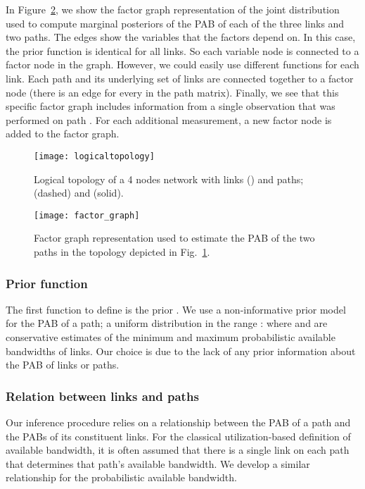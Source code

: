 \documentclass[final,5p,times,twocolumn]{elsarticle}
\begin{document}
In Figure~\ref{fig:factor_graph}, we show the factor graph representation of the joint distribution used to compute marginal posteriors of the PAB of each of the three links and two paths.  The edges show the variables that the factors depend on.  In this case, the prior function is identical for all links.  So each variable node  is connected to a factor node  in the graph.  However, we could easily use different functions for each link.  Each path and its underlying set of links  are connected together to a factor node  (there is an edge for every  in the path matrix).  Finally, we see that this specific factor graph includes information from a single observation that was performed on path .  For each additional measurement, a new factor node  is added to the factor graph.

\begin{figure}[!h]
\centering
	\texttt{[image: logicaltopology]}
	\caption{Logical topology of a 4 nodes network with  links () and  paths;  (dashed) and  (solid).  \label{fig:logicaltopology}}
\end{figure}

\begin{figure}
\centering
			\texttt{[image: factor\_graph]}
\caption{Factor graph representation used to estimate the PAB of the two paths in the topology depicted in Fig.~\ref{fig:logicaltopology}.\label{fig:factor_graph}}
\end{figure}



\subsubsection{Prior function}
The first function to define is the prior .  We use a non-informative prior model for the PAB of a path; a uniform distribution in the range : where  and  are conservative estimates of the minimum and maximum probabilistic available bandwidths of links.  Our choice is due to the lack of any prior information about the PAB of links or paths.

\subsubsection{Relation between links and paths}
\label{sssec:path_link_relation}

Our inference procedure relies on a relationship between the PAB of a path and the PABs of its constituent links.  For the classical utilization-based definition of available bandwidth, it is often assumed that there is a single link on each path that determines that path's available bandwidth.  We develop a similar relationship for the probabilistic available bandwidth.
\end{document}
